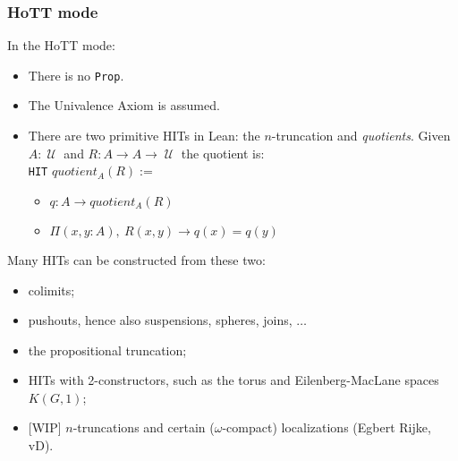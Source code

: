 \documentclass[xcolor=table]{beamer}
\newcommand{\fa}[2]{\ensuremath{\Pi(#1),\ #2}}
\newcommand{\na}{\mbox{}\\}
\DeclareMathOperator{\UU}{\mathcal{U}}
\begin{document}

\begin{frame}
\frametitle{HoTT mode}

In the HoTT mode:
\begin{itemize}
\item There is no \lstinline{Prop}.
 \item The Univalence Axiom is assumed.
 \item There are two primitive HITs in Lean: the $n$-truncation and \emph{quotients}.
  Given $A : \UU$ and $R : A \to A \to \UU$ the quotient is:\na
  \texttt{HIT} $quotient_A(R) :=$
  \begin{itemize}
  \item $q : A \to quotient_A(R)$
  \item $\fa{x, y : A}{R(x, y) \to q(x) = q(y)}$
  \end{itemize}
\end{itemize}

\bigskip

Many HITs can be constructed from these two:
  \begin{itemize}
    \item colimits;
    \item pushouts, hence also suspensions, spheres, joins, $\ldots$
    \item the propositional truncation;
    \item HITs with 2-constructors, such as the torus and Eilenberg-MacLane spaces $K(G,1)$;
    \item \mbox{}[WIP] $n$-truncations and certain ($\omega$-compact) localizations (Egbert Rijke, vD).
  \end{itemize}

\bigskip

\end{frame}
\end{document}
